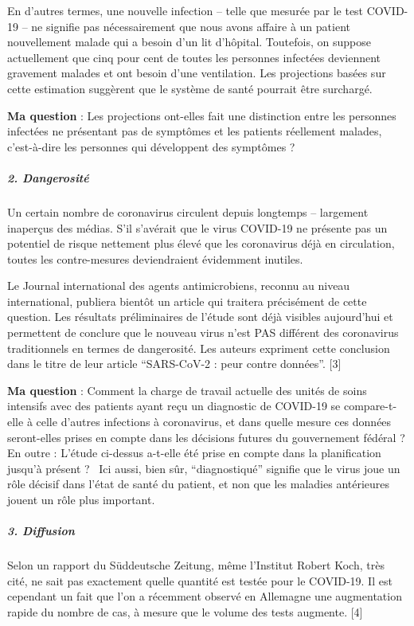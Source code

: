 En d'autres termes, une nouvelle infection -- telle que mesurée par le
test COVID-19 -- ne signifie pas nécessairement que nous avons affaire à
un patient nouvellement malade qui a besoin d'un lit d'hôpital.
Toutefois, on suppose actuellement que cinq pour cent de toutes les
personnes infectées deviennent gravement malades et ont besoin d'une
ventilation. Les projections basées sur cette estimation suggèrent que
le système de santé pourrait être surchargé.

\textbf{Ma question} : Les projections ont-elles fait une distinction
entre les personnes infectées ne présentant pas de symptômes et les
patients réellement malades, c'est-à-dire les personnes qui développent
des symptômes ?

\hypertarget{2-dangerosituxe9}{%
\subparagraph{\texorpdfstring{\textbf{2.
Dangerosité}}{2. Dangerosité}}\label{2-dangerosituxe9}}

Un certain nombre de coronavirus circulent depuis longtemps -- largement
inaperçus des médias. S'il s'avérait que le virus COVID-19 ne présente
pas un potentiel de risque nettement plus élevé que les coronavirus déjà
en circulation, toutes les contre-mesures deviendraient évidemment
inutiles.

Le Journal international des agents antimicrobiens, reconnu au niveau
international, publiera bientôt un article qui traitera précisément de
cette question. Les résultats préliminaires de l'étude sont déjà
visibles aujourd'hui et permettent de conclure que le nouveau virus
n'est PAS différent des coronavirus traditionnels en termes de
dangerosité. Les auteurs expriment cette conclusion dans le titre de
leur article ``SARS-CoV-2 : peur contre données''. {[}3{]}

\textbf{Ma question} : Comment la charge de travail actuelle des unités
de soins intensifs avec des patients ayant reçu un diagnostic de
COVID-19 se compare-t-elle à celle d'autres infections à coronavirus, et
dans quelle mesure ces données seront-elles prises en compte dans les
décisions futures du gouvernement fédéral ? En outre : L'étude ci-dessus
a-t-elle été prise en compte dans la planification jusqu'à présent ?~
Ici aussi, bien sûr, ``diagnostiqué'' signifie que le virus joue un rôle
décisif dans l'état de santé du patient, et non que les maladies
antérieures jouent un rôle plus important.

\hypertarget{3-diffusion}{%
\subparagraph{\texorpdfstring{\textbf{3.
Diffusion}}{3. Diffusion}}\label{3-diffusion}}

Selon un rapport du Süddeutsche Zeitung, même l'Institut Robert Koch,
très cité, ne sait pas exactement quelle quantité est testée pour le
COVID-19. Il est cependant un fait que l'on a récemment observé en
Allemagne une augmentation rapide du nombre de cas, à mesure que le
volume des tests augmente. {[}4{]}

